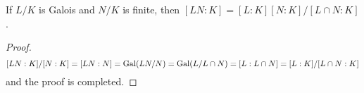 \begin{remark}
  If $L/K$ is Galois and $N/K$ is finite, then $[LN: K] = [L: K][N: K] / [L \cap N: K]$.
  \begin{proof}
    \[ [LN: K]/[N:K] = [LN: N] = \operatorname{Gal}(LN/N) = \operatorname{Gal}(L / L \cap N) = [L: L \cap N] = [L: K]/[L \cap N: K] \]
    and the proof is completed.
  \end{proof}
\end{remark}
